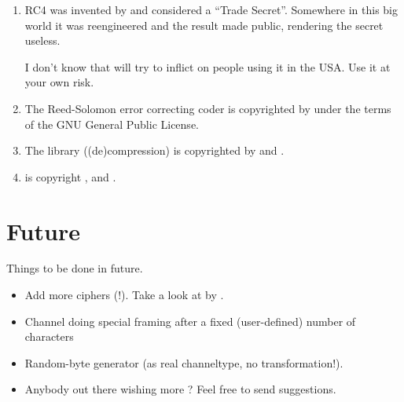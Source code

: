 \documentclass {report}
\begin{document}
\begin {enumerate}
	\begin {quotation}
		Blowfish is unpatented, and will remain so in all
		countries. The algorithm is hereby placed in the
		public domain, and can be freely used by anyone.
	\end {quotation}

\item	RC4 was invented by \rsadsi{} and considered a ``Trade
	Secret''. Somewhere in this big world it was reengineered and
	the result made public, rendering the secret useless.

	I don't know that \rsadsi{} will try to inflict on people using
	it in the USA. Use it at your own risk.

\item	The Reed-Solomon error correcting coder is copyrighted by
	\paulf{} under the terms of the GNU General Public License.

\item	The library \zlib{} ((de)compression) is copyrighted by
	\jlgailly{} and \madler.

\item	\rmd{} is copyright \dobbertin{}, \bosselaers{} and \preneel{}.
\end   {enumerate}


\chapter {Future}

Things to be done in future.

\begin {itemize}

\item	Add more ciphers (\PGP!). Take a look at \pgplib{} by
	\tage{}.


\item	Channel doing special framing after a fixed (user-defined)
	number of characters

\item	Random-byte generator (as real channeltype, no
	transformation!).


\item	Anybody out there wishing more ? Feel free to send \me{}
	suggestions.
\end   {itemize}


\printindex
\end{document}
